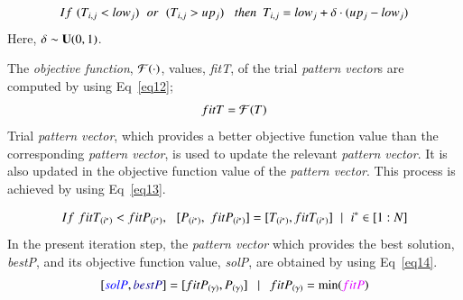 \documentclass[preprint,10pt,3p]{elsarticle}
\begin{document}
\begin{equation}\label{eq11}
If\,\,({T_{i,j}} < low{_j})\,\,\,{\kern 1pt} or\,\,\,{\kern 1pt} ({T_{i,j}} > up{_j})\,\,\,\,\,then\,\,\,{T_{i,j}} = low{_j} + \delta  \cdot (up{_j} - low{_j})
\end{equation}
Here, $\delta \sim {\bf{U}}(0,1)$.

The \emph{objective function}, ${\cal F(\cdot)}$,  values, \emph{fitT}, ​​of the trial \emph{pattern vector}s are computed by using Eq~\ref{eq12};
\begin{equation}\label{eq12}
  fitT = {\cal F}(T)
\end{equation}
Trial \emph{pattern vector}, which provides a better objective function value than the corresponding \emph{pattern vector}, is used to update the relevant \emph{pattern vector}. It is also updated in the objective function value of the \emph{pattern vector}. This process is achieved by using Eq~\ref{eq13}.

\begin{equation}\label{eq13}
  If\,\,fit{T_{({i^*})}} < fit{P_{({i^*})}},\,\,\,\,[{P_{({i^*})}},\,\,fit{P_{({i^*})}}] = [{T_{({i^*})}},fit{T_{({i^*})}}]{\mkern 1mu} {\mkern 1mu} \,\,\,|\,\,\,{\mkern 1mu} {\mkern 1mu} {i^*} \in [1:N]
\end{equation}
In the present iteration step, the \emph{pattern vector} which provides the best solution, \emph{\textcolor{ultramarine}{bestP}}, and its objective function value, \emph{\textcolor{ao}{solP}}, are obtained by using Eq~\ref{eq14}.
\begin{equation}\label{eq14}
  [\textcolor{ao}{solP},\textcolor{ultramarine}{bestP}] = [fit{P_{(\gamma )}},{P_{(\gamma )}}]{\mkern 1mu} \,\,\,\,{\mkern 1mu} |\,\,\,\,{\mkern 1mu} {\mkern 1mu} fit{P_{(\gamma )}} = \min (\textcolor{psychedelicpurple}{fitP})
\end{equation}
\end{document}
